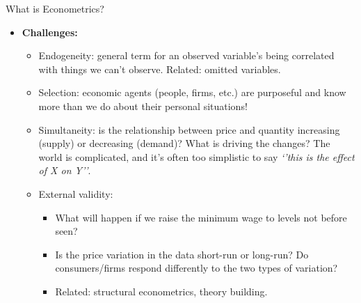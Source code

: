 \documentclass[aspectratio=169,11pt]{beamer}
\begin{document}
\begin{frame}{What is Econometrics?}
\begin{itemize}	

	\item{\bf Challenges:}
		\begin{itemize}
				\item Endogeneity: general term for an observed variable's being correlated with things we can't observe.
				Related: omitted variables. 
				\medskip
				\item Selection: economic agents (people, firms, etc.) are purposeful and know more than we do about their personal situations!
				\medskip
				\item Simultaneity: is the relationship between price and quantity increasing (supply) or decreasing (demand)? 
				 What is driving the changes? 
				The world is complicated, and it's often too simplistic to say \emph{`'this is the effect of X on Y''}. 
				
			\medskip
			\item External validity:
			\begin{itemize}
				\item What will happen if we raise the minimum wage to levels not before seen? 
				\item Is the price variation in the data short-run or long-run? Do consumers/firms respond differently to 
				the two types of variation?
				\item Related: structural econometrics, theory building. 
			\end{itemize}
		\end{itemize}	
\end{itemize}
\end{frame}
\end{document}
